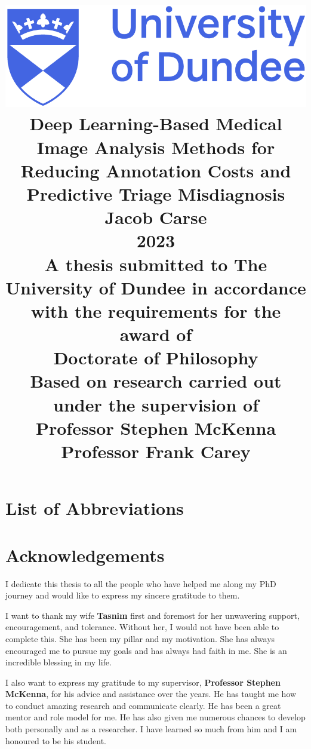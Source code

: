 \documentclass[12pt]{report}
\title{
	{\includegraphics[scale=0.4]{dundee_logo.png}}\\
	\vspace{15mm}
	{Deep Learning-Based Medical Image Analysis Methods for Reducing Annotation Costs and Predictive Triage Misdiagnosis}\\
	\vspace{5mm}
	{\Large Jacob Carse}\\
	{\Large 2023}\\
	\vspace{5mm}
	{\normalsize A thesis submitted to The University of Dundee in accordance with the requirements for the award of}\\
	{\large Doctorate of Philosophy}\\
	\vspace{5mm}
	{\normalsize Based on research carried out under the supervision of}\\
	{\large Professor Stephen McKenna}\\
	{\large Professor Frank Carey}
}
\date{\vspace{-5ex}}
\author{}
\begin{document}
	
	\maketitle
	
	\renewcommand{\contentsname}{Table of Contents}
	\tableofcontents
	
	\newpage
	\listoffigures
	
	\newpage
	\listoftables
	
	
	\newpage
	\chapter*{List of Abbreviations}
	
	
	
	\newpage
	\chapter*{Acknowledgements}
	I dedicate this thesis to all the people who have helped me along my PhD journey and would like to express my sincere gratitude to them.
	
	I want to thank my wife \textbf{Tasnim} first and foremost for her unwavering support, encouragement, and tolerance. Without her, I would not have been able to complete this. She has been my pillar and my motivation. She has always encouraged me to pursue my goals and has always had faith in me. She is an incredible blessing in my life.
	
	I also want to express my gratitude to my supervisor, \textbf{Professor Stephen McKenna}, for his advice and assistance over the years. He has taught me how to conduct amazing research and communicate clearly. He has been a great mentor and role model for me. He has also given me numerous chances to develop both personally and as a researcher. I have learned so much from him and I am honoured to be his student.
	
\end{document}

